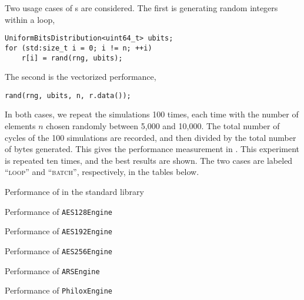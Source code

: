 Two usage cases of \rng{}s are considered. The first is generating random
integers within a loop,
\begin{verbatim}
UniformBitsDistribution<uint64_t> ubits;
for (std:size_t i = 0; i != n; ++i)
    r[i] = rand(rng, ubits);
\end{verbatim}
The second is the vectorized performance,
\begin{verbatim}
rand(rng, ubits, n, r.data());
\end{verbatim}
In both cases, we repeat the simulations 100 times, each time with the number
of elements $n$ chosen randomly between 5,000 and 10,000. The total number of
cycles of the 100 simulations are recorded, and then divided by the total
number of bytes generated. This gives the performance measurement in \cpb. This
experiment is repeated ten times, and the best results are shown. The two cases
are labeled ``\textsc{loop}'' and ``\textsc{batch}'', respectively, in the
tables below.

\begin{table}
  \caption{Performance of \rng in the standard library}
  \label{tab:Performance of RNG in the standard library RNG}
\end{table}

\begin{table}
  \caption{Performance of \protect\texttt{AES128Engine}}
  \label{tab:Performance of AES128Engine}
\end{table}

\begin{table}
  \caption{Performance of \protect\texttt{AES192Engine}}
  \label{tab:Performance of AES192Engine}
\end{table}

\begin{table}
  \caption{Performance of \protect\texttt{AES256Engine}}
  \label{tab:Performance of AES256Engine}
\end{table}

\begin{table}
  \caption{Performance of \protect\texttt{ARSEngine}}
  \label{tab:Performance of ARSEngine}
\end{table}

\begin{table}
  \caption{Performance of \protect\texttt{PhiloxEngine}}
  \label{tab:Performance of PhiloxEngine}
\end{table}

